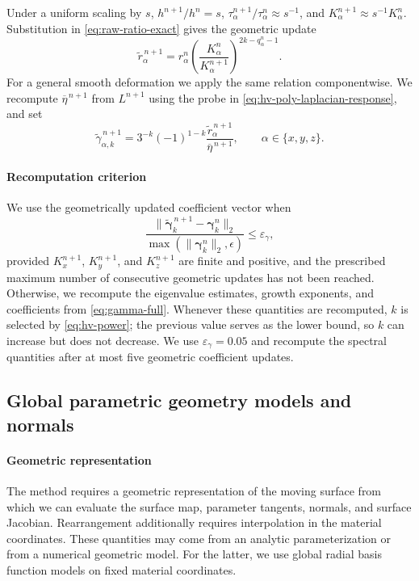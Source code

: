 \documentclass[a4paper,fleqn]{cas-sc}
\begin{document}
Under a uniform scaling by $s$,
$h^{n+1}/h^n=s$, $\tau_\alpha^{n+1}/\tau_\alpha^n\approx s^{-1}$, and
$K_\alpha^{n+1}\approx s^{-1}K_\alpha^n$.  Substitution in
\eqref{eq:raw-ratio-exact} gives the geometric update
\begin{equation}
  \widetilde r_\alpha^{\,n+1}
  =
  r_\alpha^n
  \left(
    \frac{K_\alpha^n}{K_\alpha^{n+1}}
  \right)^{2k-q_\alpha^n-1}.
  \label{eq:raw-gamma-update}
\end{equation}
For a general smooth deformation we apply the same relation componentwise.
We recompute $\overline\eta^{\,n+1}$ from $L^{n+1}$ using the probe in
\eqref{eq:hv-poly-laplacian-response}, and set
\begin{equation}
  \widetilde\gamma_{\alpha,k}^{\,n+1}
  =
  3^{-k}(-1)^{1-k}
  \frac{\widetilde r_\alpha^{\,n+1}}
       {\overline\eta^{\,n+1}},
  \qquad \alpha\in\{x,y,z\}.
  \label{eq:gamma-predictor}
\end{equation}

\paragraph{Recomputation criterion}
We use the geometrically updated coefficient vector when
\[
  \frac{
    \|\widetilde{\bm\gamma}_k^{\,n+1}-\bm\gamma_k^n\|_2
  }{
    \max(\|\bm\gamma_k^n\|_2,\epsilon)
  }
  \leq \varepsilon_\gamma,
\]
provided $K_x^{n+1}$, $K_y^{n+1}$, and $K_z^{n+1}$ are finite and positive, and the prescribed
maximum number of consecutive geometric updates has not been reached.
Otherwise, we recompute the eigenvalue estimates, growth exponents, and
coefficients from \eqref{eq:gamma-full}.  Whenever these quantities are
recomputed, $k$ is selected by \eqref{eq:hv-power}; the previous value serves
as the lower bound, so $k$ can increase but does not decrease.  We use
$\varepsilon_\gamma=0.05$ and recompute the spectral quantities after at most
five geometric coefficient updates.

\subsection{Global parametric geometry models and normals}
\label{subsec:global-parametric-sbf-models}

\paragraph{Geometric representation}
The method requires a geometric representation of the moving surface from
which we can evaluate the surface map, parameter tangents, normals, and surface
Jacobian.  Rearrangement additionally requires interpolation in the material
coordinates.  These quantities may come from an analytic parameterization or
from a numerical geometric model.  For the latter, we use global radial basis
function models on fixed material coordinates.
\end{document}
